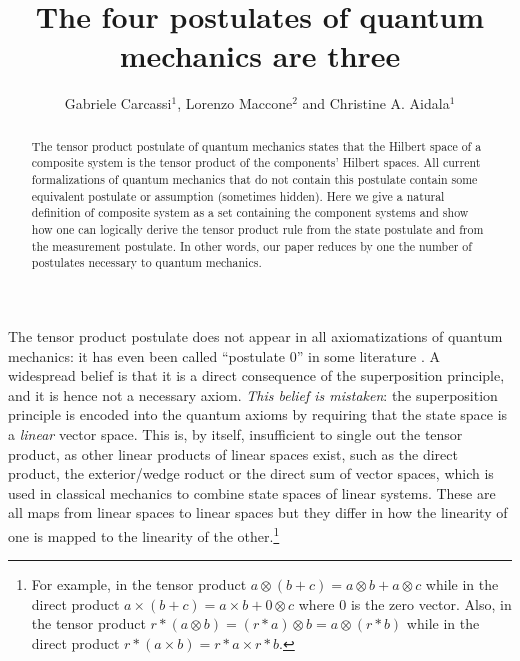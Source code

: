 \documentclass[aps,prl,amsmath,amssymb,twocolumn,nofootinbib]{revtex4}
\theoremstyle{plain}
\theoremstyle{definition}
\theoremstyle{remark}
\begin{document}
	
\title{The four postulates of quantum mechanics are three}
\author{Gabriele Carcassi$^1$, Lorenzo Maccone$^{2}$ and Christine A. Aidala$^1$
}
\begin{abstract}
The tensor product postulate of quantum mechanics states that the
Hilbert space of a composite system is the tensor product of the
components' Hilbert spaces. All current formalizations of quantum
mechanics that do not contain this postulate contain some equivalent
postulate or assumption (sometimes hidden). Here we give a natural
definition of composite system as a set containing the component
systems and show how one can logically derive the tensor product
rule from the state postulate and from the measurement postulate. In
other words, our paper reduces by one the number of postulates
necessary to quantum mechanics.
\end{abstract}
\pacs{}
\maketitle


The tensor product postulate does not appear in all axiomatizations of
quantum mechanics: it has even been called ``postulate 0'' in some
literature \cite{zurek}. A widespread belief is that it is a direct
consequence of the superposition principle, and it is hence not a
necessary axiom. {\em This belief is mistaken}: the superposition
principle is encoded into the quantum axioms by requiring that the
state space is a {\em linear} vector space. This is, by itself,
insufficient to single out the tensor product, as other linear
products of linear spaces exist, such as the direct product, the exterior/wedge roduct or the direct sum of vector spaces, which is used
	in classical mechanics to combine state spaces of linear systems. These are all maps from linear spaces to linear spaces but they differ in how the linearity of one is mapped to the linearity of the other.\footnote{For example, in the tensor product $a \otimes (b+c) = a \otimes b + a \otimes c$ while in the direct product $a \times (b+c) = a \times b + 0 \otimes c$ where $0$ is the zero vector. Also, in the tensor product $r * (a \otimes b) = (r*a) \otimes b = a \otimes (r*b)$ while in the direct product $r * (a \times b) = r*a \times r*b$.}
	
\end{document}
